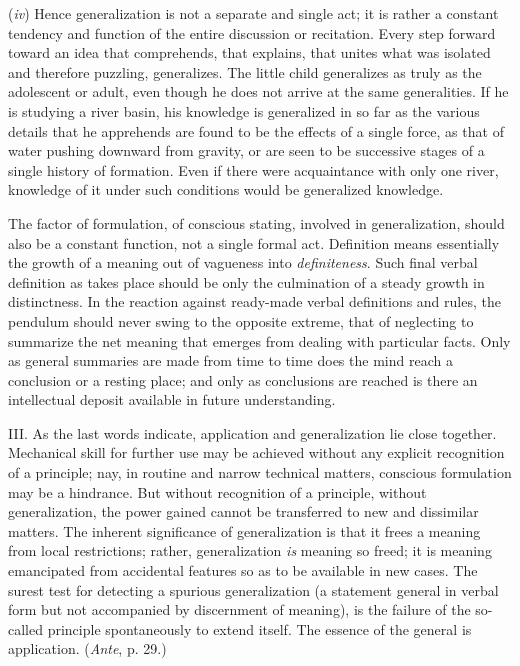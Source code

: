 \documentclass[letterpaper]{book}
\begin{document}
(\emph{iv}) Hence generalization is not a separate and single act; it is
rather a constant tendency and function of the entire discussion or
recitation. Every step forward toward an idea that comprehends, that
explains, that unites what was isolated and therefore puzzling,
generalizes. The little child generalizes as truly as the adolescent or
adult, even though he does not arrive at the same generalities. If he is
studying a river basin, his knowledge is generalized in so far as the
various details that he apprehends are found to be the effects of a
single force, as that of water pushing downward from gravity, or are
seen to be successive stages of a single history of formation. Even if
there were acquaintance with only one river, knowledge of it under such
conditions would be generalized
knowledge.


The factor of formulation, of conscious stating, involved in
generalization, should also be a constant function, not a single formal
act. Definition means essentially the growth of a meaning out of
vagueness into \emph{definiteness}. Such final verbal definition as
takes place should be only the culmination of a steady growth in
distinctness. In the reaction against ready-made verbal definitions and
rules, the pendulum should never swing to the opposite extreme, that of
neglecting to summarize the net meaning that emerges from dealing with
particular facts. Only as general summaries are made from time to time
does the mind reach a conclusion or a resting place; and only as
conclusions are reached is there an intellectual deposit available in
future understanding.


III. As the last words indicate, application and generalization lie
close together. Mechanical skill for further use may be achieved without
any explicit recognition of a principle; nay, in routine and narrow
technical matters, conscious formulation may be a hindrance. But without
recognition of a principle, without generalization, the power gained
cannot be transferred to new and dissimilar matters. The inherent
significance of generalization is that it frees a meaning from local
restrictions; rather, generalization \emph{is} meaning so freed; it is
meaning emancipated from accidental features so as to be available in
new cases. The surest test for detecting a spurious generalization (a
statement general in verbal form but not accompanied by discernment of
meaning), is the failure of the so-called principle spontaneously to
extend itself. The essence of the general is application. (\emph{Ante},
p. 29.)
\end{document}
